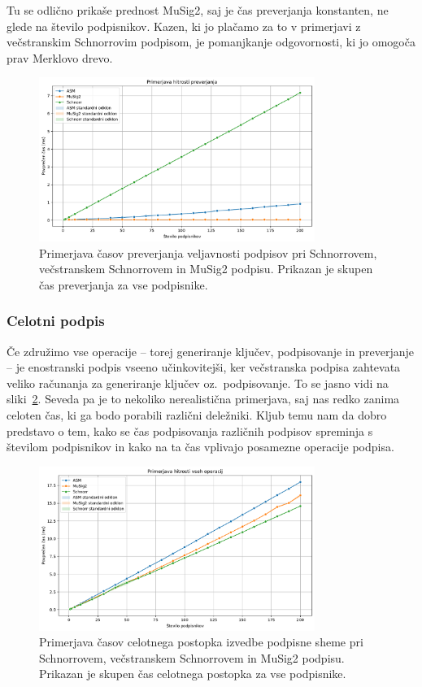 \documentclass[isrm2, tisk]{fmfdelo}
\begin{document}
Tu se odlično prikaše prednost MuSig2, saj je čas preverjanja konstanten, ne glede na število
podpisnikov. Kazen, ki jo plačamo za to v primerjavi z večstranskim Schnorrovim podpisom, je pomanjkanje
odgovornosti, ki jo omogoča prav Merklovo drevo.

\begin{figure}[ht]
  \centering
  \includegraphics[width=0.8\textwidth]{images/benchmark_Verification.pdf}
  \caption[Preverjanje.]{Primerjava časov preverjanja veljavnosti podpisov pri Schnorrovem, večstranskem
    Schnorrovem in MuSig2 podpisu. Prikazan je skupen čas preverjanja za vse podpisnike.}
  \label{fig:preverjanje}
\end{figure}

\subsubsection{Celotni podpis}
Če združimo vse operacije -- torej generiranje ključev, podpisovanje in preverjanje -- je enostranski
podpis vseeno učinkovitejši, ker večstranska podpisa zahtevata veliko računanja za generiranje
ključev oz.\ podpisovanje. To se jasno vidi na sliki~\ref{fig:celotni}. Seveda pa je to nekoliko
nerealistična primerjava, saj nas redko zanima celoten čas, ki ga bodo porabili različni deležniki.
Kljub temu nam da dobro predstavo o tem, kako se čas podpisovanja različnih podpisov spreminja s
številom podpisnikov in kako na ta čas vplivajo posamezne operacije podpisa.

\begin{figure}[ht]
  \centering
  \includegraphics[width=0.8\textwidth]{images/benchmark_All.pdf}
  \caption[Celotni podpis.]{Primerjava časov celotnega postopka izvedbe podpisne sheme pri Schnorrovem,
      večstranskem Schnorrovem in MuSig2 podpisu. Prikazan je skupen čas celotnega postopka za vse
      podpisnike.}
  \label{fig:celotni}
\end{figure}
\end{document}
